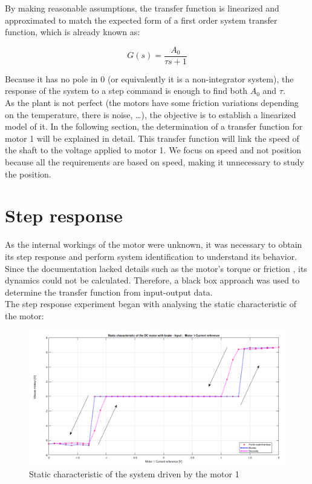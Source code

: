 By making reasonable assumptions, the transfer function is linearized and approximated to match the expected form of a 
first order system transfer function, which is already known as:

\begin{equation}
    G(s) = \frac{A_0}{\tau s + 1}
    \label{eq:1_st_order_TF}
\end{equation}

Because it has no pole in $0$ (or equivalently it is a non-integrator system), the response of the system to a step
command is enough to find both $A_0$ and $\tau$.\\

As the plant is not perfect (the motors have some friction variations depending on the temperature, there is noise, 
\dots), the objective is to establish a linearized model of it. In the following section, the determination of a 
transfer function for motor 1 will be explained in detail. This transfer function will link the speed of the shaft to 
the voltage applied to motor 1. We focus on speed and not position because all the requirements are based on speed, 
making it unnecessary to study the position.\\

\section{Step response}

As the internal workings of the motor were unknown, it was necessary to obtain its step response and perform system 
identification to understand its behavior. Since the documentation lacked details such as the motor's torque or friction
, its dynamics could not be calculated. Therefore, a black box approach was used to determine the transfer function from
 input-output data.\\

The step response experiment began with analysing the static characteristic of the motor:

\begin{figure}[H]
    \centering
    \includegraphics[height=\textheight/4]{Pictures/static_characteristic_motor_1.png}
    \caption{Static characteristic of the system driven by the motor 1}
    \label{fig:static_characteristic_motor_1}
\end{figure}


